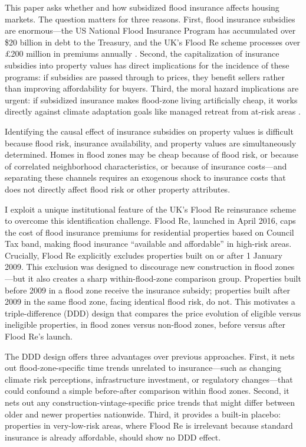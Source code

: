 \documentclass[12pt]{article}
\begin{document}
This paper asks whether and how subsidized flood insurance affects housing markets. The question matters for three reasons. First, flood insurance subsidies are enormous---the US National Flood Insurance Program has accumulated over \$20 billion in debt to the Treasury, and the UK's Flood Re scheme processes over \pounds200 million in premiums annually \citep{kousky2017examining, floodre2023annual}. Second, the capitalization of insurance subsidies into property values has direct implications for the incidence of these programs: if subsidies are passed through to prices, they benefit sellers rather than improving affordability for buyers. Third, the moral hazard implications are urgent: if subsidized insurance makes flood-zone living artificially cheap, it works directly against climate adaptation goals like managed retreat from at-risk areas \citep{depietri2022flood}.

Identifying the causal effect of insurance subsidies on property values is difficult because flood risk, insurance availability, and property values are simultaneously determined. Homes in flood zones may be cheap because of flood risk, or because of correlated neighborhood characteristics, or because of insurance costs---and separating these channels requires an exogenous shock to insurance costs that does not directly affect flood risk or other property attributes.

I exploit a unique institutional feature of the UK's Flood Re reinsurance scheme to overcome this identification challenge. Flood Re, launched in April 2016, caps the cost of flood insurance premiums for residential properties based on Council Tax band, making flood insurance ``available and affordable'' in high-risk areas. Crucially, Flood Re explicitly excludes properties built on or after 1 January 2009. This exclusion was designed to discourage new construction in flood zones---but it also creates a sharp within-flood-zone comparison group. Properties built before 2009 in a flood zone receive the insurance subsidy; properties built after 2009 in the same flood zone, facing identical flood risk, do not. This motivates a triple-difference (DDD) design that compares the price evolution of eligible versus ineligible properties, in flood zones versus non-flood zones, before versus after Flood Re's launch.

The DDD design offers three advantages over previous approaches. First, it nets out flood-zone-specific time trends unrelated to insurance---such as changing climate risk perceptions, infrastructure investment, or regulatory changes---that could confound a simple before-after comparison within flood zones. Second, it nets out any construction-vintage-specific price trends that might differ between older and newer properties nationwide. Third, it provides a built-in placebo: properties in very-low-risk areas, where Flood Re is irrelevant because standard insurance is already affordable, should show no DDD effect.
\end{document}
